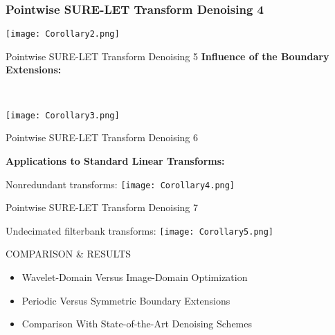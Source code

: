 \documentclass{beamer}
\begin{document}
	
	\begin{frame}
		\frametitle{Pointwise SURE-LET Transform Denoising 4}
\texttt{[image: Corollary2.png]}	
	\end{frame}
	
	
	\begin{frame}{Pointwise SURE-LET Transform Denoising 5}
\textbf{Influence of the Boundary Extensions:}
	
	\
	
	\texttt{[image: Corollary3.png]}
	
\end{frame}

	
	
	

		\begin{frame}{Pointwise SURE-LET Transform Denoising 6}

\textbf{Applications to Standard Linear Transforms:}
\begin{block}{Nonredundant transforms:}
\texttt{[image: Corollary4.png]}
\end{block}




	
	
	\end{frame}
	

	
	
	
	
	\begin{frame}{Pointwise SURE-LET Transform Denoising 7}
	
	\begin{block}{Undecimated filterbank transforms:}
		\texttt{[image: Corollary5.png]}
	\end{block}
	
\end{frame}



	
	
	
	\begin{frame}{COMPARISON \& RESULTS}
	\begin{itemize}
		\item  Wavelet-Domain Versus Image-Domain Optimization
		\item Periodic Versus Symmetric Boundary Extensions
		\item Comparison With State-of-the-Art Denoising Schemes
	\end{itemize}
	
	
\end{frame}
\end{document}
